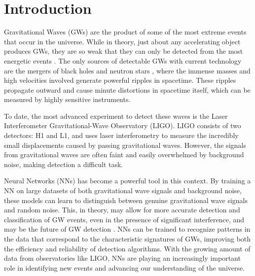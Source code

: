 \documentclass[%
reprint,
amsmath,amssymb,
aps,
]{revtex4-2}
\begin{document}
\maketitle

\section{Introduction}
Gravitational Waves (GWs) are the product of some of the most extreme events that occur in the universe. While in theory, just about any accelerating object produces GWs, they are so weak that they can only be detected from the most energetic events \cite{ligo_gw_sources}. The only sources of detectable GWs with current technology are the mergers of black holes and neutron stars \cite{LIGOScientific:2007fwp}, where the immense masses and high velocities involved generate powerful ripples in spacetime. These ripples propagate outward and cause minute distortions in spacetime itself, which can be measured by highly sensitive instruments.

To date, the most advanced experiment to detect these waves is the Laser Interferometer Gravitational-Wave Observatory (LIGO). LIGO consists of two detectors: H1 and L1, and uses laser interferometry to measure the incredibly small displacements caused by passing gravitational waves. However, the signals from gravitational waves are often faint and easily overwhelmed by background noise, making detection a difficult task.

Neural Networks (NNs) has become a powerful tool in this context. By training a NN on large datasets of both gravitational wave signals and background noise, these models can learn to distinguish between genuine gravitational wave signals and random noise. This, in theory, may allow for more accurate detection and classification of GW events, even in the presence of significant interference, and may be the future of GW detection \cite{Marx:2024wjt, skliris2024}. NNs can be trained to recognize patterns in the data that correspond to the characteristic signatures of GWs, improving both the efficiency and reliability of detection algorithms. With the growing amount of data from observatories like LIGO, NNs are playing an increasingly important role in identifying new events and advancing our understanding of the universe.
\end{document}
